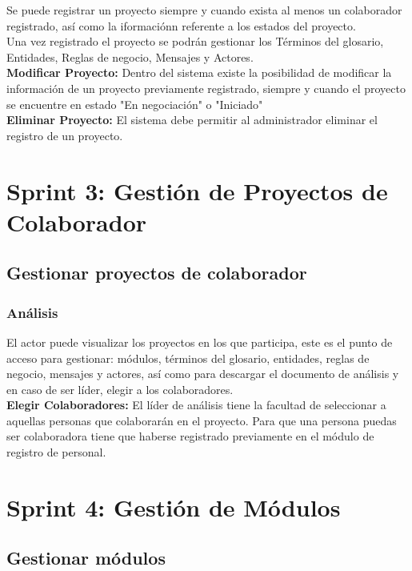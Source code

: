Se puede registrar un proyecto siempre y cuando exista al menos un colaborador registrado, así como la iformaciónn referente a los estados del proyecto.\\

Una vez registrado el proyecto se podrán gestionar los Términos del glosario, Entidades, Reglas de negocio, Mensajes y Actores.\\

\textbf {Modificar Proyecto:}
Dentro del sistema existe la posibilidad de modificar la información de un proyecto previamente registrado, siempre y cuando el proyecto se encuentre en estado "En negociación" o "Iniciado"\\

\textbf {Eliminar Proyecto:}
El sistema debe permitir al administrador eliminar el registro de un proyecto.\\



\section{Sprint 3: Gestión de Proyectos de Colaborador}
\subsection{Gestionar proyectos de colaborador}
\subsubsection {Análisis}
El actor puede visualizar los proyectos en los que participa, este es el punto de acceso para gestionar: módulos, términos del glosario, entidades, reglas de negocio, mensajes y actores, así como para descargar el documento de análisis y en caso de ser líder, elegir a los colaboradores.\\

\textbf {Elegir Colaboradores:} El líder de análisis tiene la facultad de seleccionar a aquellas personas que colaborarán en el proyecto. Para que una persona puedas ser colaboradora tiene que haberse registrado previamente en el módulo de registro de personal.\\

\section{Sprint 4: Gestión de Módulos}
\subsection{Gestionar módulos}

